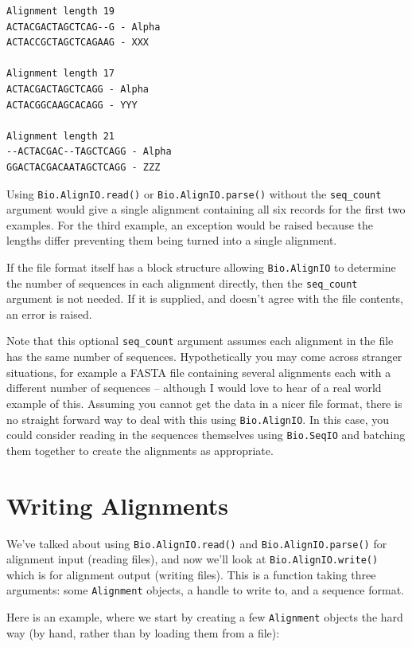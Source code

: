 \documentclass{report}
\begin{document}
\begin{verbatim}
Alignment length 19
ACTACGACTAGCTCAG--G - Alpha
ACTACCGCTAGCTCAGAAG - XXX

Alignment length 17
ACTACGACTAGCTCAGG - Alpha
ACTACGGCAAGCACAGG - YYY

Alignment length 21
--ACTACGAC--TAGCTCAGG - Alpha
GGACTACGACAATAGCTCAGG - ZZZ
\end{verbatim}

Using \verb|Bio.AlignIO.read()| or \verb|Bio.AlignIO.parse()| without the \verb|seq_count| argument would give a single alignment containing all six records for the first two examples.  For the third example, an exception would be raised because the lengths differ preventing them being turned into a single alignment.

If the file format itself has a block structure allowing \verb|Bio.AlignIO| to determine the number of sequences in each alignment directly, then the \verb|seq_count| argument is not needed.  If it is supplied, and doesn't agree with the file contents, an error is raised.

Note that this optional \verb|seq_count| argument assumes each alignment in the file has the same number of sequences.  Hypothetically you may come across stranger situations, for example a FASTA file containing several alignments each with a different number of sequences -- although I would love to hear of a real world example of this.  Assuming you cannot get the data in a nicer file format, there is no straight forward way to deal with this using \verb|Bio.AlignIO|.  In this case, you could consider reading in the sequences themselves using \verb|Bio.SeqIO| and batching them together to create the alignments as appropriate.

\section{Writing Alignments}

We've talked about using \verb|Bio.AlignIO.read()| and \verb|Bio.AlignIO.parse()| for alignment input (reading files), and now we'll look at \verb|Bio.AlignIO.write()| which is for alignment output (writing files).  This is a function taking three arguments: some \verb|Alignment| objects, a handle to write to, and a sequence format.

Here is an example, where we start by creating a few \verb|Alignment| objects the hard way (by hand, rather than by loading them from a file):
\end{document}
